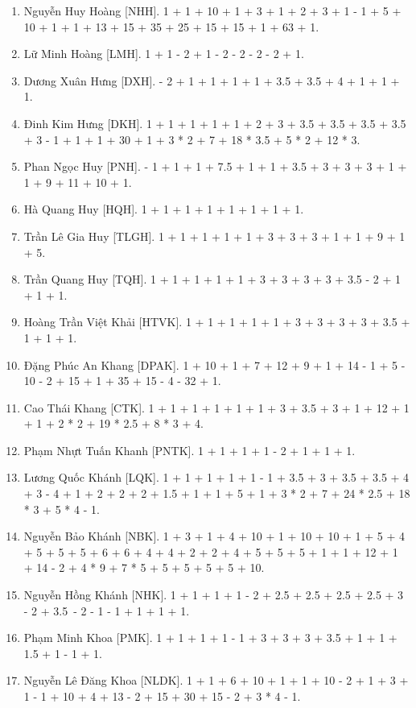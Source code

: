 \documentclass{article}
\begin{document}
\begin{enumerate}
	\item {\sc Nguyễn Huy Hoàng [NHH].} 1 + 1 + 10 + 1 + 3 + 1 + 2 + 3 + 1 - 1 + 5 + 10 + 1 + 1 + 13 + 15 + 35 + 25 + 15 + 15 + 1 + 63 + 1.
	\item {\sc Lữ Minh Hoàng [LMH].} 1 + 1 - 2 + 1 - 2 - 2 - 2 - 2 + 1.
	\item {\sc Dương Xuân Hưng [DXH].} - 2 + 1 + 1 + 1 + 1 + 3.5 + 3.5 + 4 + 1 + 1 + 1.
	\item {\sc Đinh Kim Hưng [DKH].} 1 + 1 + 1 + 1 + 1 + 2 + 3 + 3.5 + 3.5 + 3.5 + 3.5 + 3 - 1 + 1 + 1 + 30 + 1 + 3 * 2 + 7 + 18 * 3.5 + 5 * 2 + 12 * 3.
	\item {\sc Phan Ngọc Huy [PNH].} - 1 + 1 + 1 + 7.5 + 1 + 1 + 3.5 + 3 + 3 + 3 + 1 + 1 + 9 + 11 + 10 + 1.
	\item {\sc Hà Quang Huy [HQH].} 1 + 1 + 1 + 1 + 1 + 1 + 1 + 1.
	\item {\sc Trần Lê Gia Huy [TLGH].} 1 + 1 + 1 + 1 + 1 + 3 + 3 + 3 + 1 + 1 + 9 + 1 + 5.
	\item {\sc Trần Quang Huy [TQH].} 1 + 1 + 1 + 1 + 1 + 3 + 3 + 3 + 3 + 3.5 - 2 + 1 + 1 + 1.
	\item {\sc Hoàng Trần Việt Khải [HTVK].} 1 + 1 + 1 + 1 + 1 + 3 + 3 + 3 + 3 + 3.5 + 1 + 1 + 1.
	\item {\sc Đặng Phúc An Khang [DPAK].} 1 + 10 + 1 + 7 + 12 + 9 + 1 + 14 - 1 + 5 - 10 - 2 + 15 + 1 + 35 + 15 - 4 - 32 + 1.
	\item {\sc Cao Thái Khang [CTK].} 1 + 1 + 1 + 1 + 1 + 1 + 3 + 3.5 + 3 + 1 + 12 + 1 + 1 + 2 * 2 + 19 * 2.5 + 8 * 3 + 4.
	\item {\sc Phạm Nhựt Tuấn Khanh [PNTK].} 1 + 1 + 1 + 1 - 2 + 1 + 1 + 1.
	\item {\sc Lương Quốc Khánh [LQK].} 1 + 1 + 1 + 1 + 1 - 1 + 3.5 + 3 + 3.5 + 3.5 + 4 + 3 - 4 + 1 + 2 + 2 + 2 + 1.5 + 1 + 1 + 5 + 1 + 3 * 2 + 7 + 24 * 2.5 + 18 * 3 + 5 * 4 - 1.
	\item {\sc Nguyễn Bảo Khánh [NBK].} 1 + 3 + 1 + 4 + 10 + 1 + 10 + 10 + 1 + 5 + 4 + 5 + 5 + 5 + 6 + 6 + 4 + 4 + 2 + 2 + 4 + 5 + 5 + 5 + 1 + 1 + 12 + 1 + 14 - 2 + 4 * 9 + 7 * 5 + 5 + 5 + 5 + 5 + 10.
	\item {\sc Nguyễn Hồng Khánh [NHK].} 1 + 1 + 1 + 1 - 2 + 2.5 + 2.5 + 2.5 + 2.5 + 3 - 2 + 3.5 - 2 - 1 - 1 + 1 + 1 + 1.
	\item {\sc Phạm Minh Khoa [PMK].} 1 + 1 + 1 + 1 - 1 + 3 + 3 + 3 + 3.5 + 1 + 1 + 1.5 + 1 - 1 + 1.
	\item {\sc Nguyễn Lê Đăng Khoa [NLDK].} 1 + 1 + 6 + 10 + 1 + 1 + 10 - 2 + 1 + 3 + 1 - 1 + 10 + 4 + 13 - 2 + 15 + 30 + 15 - 2 + 3 * 4 - 1.

\end{enumerate}
\end{document}
